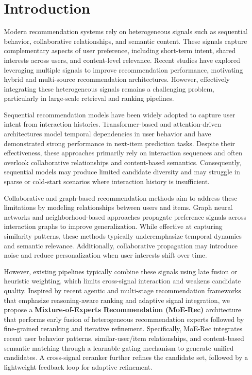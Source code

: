 \documentclass[sigconf,anonymous]{acmart}
\begin{document}

\maketitle

\section{Introduction}

Modern recommendation systems rely on heterogeneous signals such as sequential behavior, collaborative relationships, and semantic content. These signals capture complementary aspects of user preference, including short-term intent, shared interests across users, and content-level relevance. Recent studies have explored leveraging multiple signals to improve recommendation performance, motivating hybrid and multi-source recommendation architectures. However, effectively integrating these heterogeneous signals remains a challenging problem, particularly in large-scale retrieval and ranking pipelines.

Sequential recommendation models have been widely adopted to capture user intent from interaction histories. Transformer-based and attention-driven architectures model temporal dependencies in user behavior and have demonstrated strong performance in next-item prediction tasks. Despite their effectiveness, these approaches primarily rely on interaction sequences and often overlook collaborative relationships and content-based semantics. Consequently, sequential models may produce limited candidate diversity and may struggle in sparse or cold-start scenarios where interaction history is insufficient.

Collaborative and graph-based recommendation methods aim to address these limitations by modeling relationships between users and items. Graph neural networks and neighborhood-based approaches propagate preference signals across interaction graphs to improve generalization. While effective at capturing similarity patterns, these methods typically underemphasize temporal dynamics and semantic relevance. Additionally, collaborative propagation may introduce noise and reduce personalization when user interests shift over time.

However, existing pipelines typically combine these signals using late fusion or heuristic weighting, which limits cross-signal interaction and weakens candidate quality. Inspired by recent agentic and multi-stage recommendation frameworks that emphasize reasoning-aware ranking and adaptive signal integration, we propose a \textbf{Mixture-of-Experts Recommendation (MoE-Rec)} architecture that performs early fusion of heterogeneous recommendation experts followed by fine-grained reranking and iterative refinement. Specifically, MoE-Rec integrates recent user behavior patterns, similar-user/item relationships, and content-based semantic matching through a learnable gating mechanism to generate unified candidates. A cross-signal reranker further refines the candidate set, followed by a lightweight feedback loop for adaptive refinement.
\end{document}
